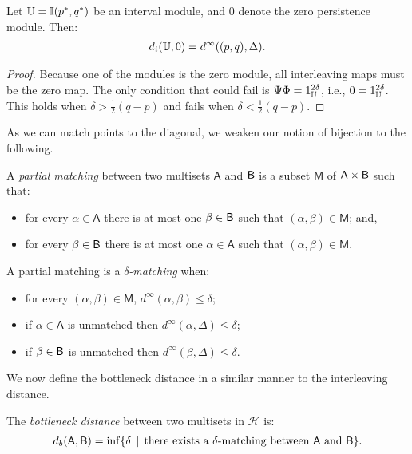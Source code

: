 \begin{proposition}
Let $\mathbb{U} = \mathbb{I}(p^*, q^*)$ be an interval module, and $0$ denote the zero persistence module. Then:
\begin{align*}
d_i(\mathbb{U}, 0) = d^\infty((p, q), \Delta).
\end{align*}
\end{proposition}
\begin{proof}
Because one of the modules is the zero module, all interleaving maps must be the zero map. The only condition that could fail is $\Psi \Phi = 1_{\mathbb{U}}^{2\delta}$, i.e., $0 = 1_{\mathbb{U}}^{2\delta}$. This holds when $\delta > \tfrac{1}{2}(q-p)$ and fails when $\delta < \tfrac{1}{2}(q-p)$.
\end{proof}

As we can match points to the diagonal, we weaken our notion of bijection to the following.

\begin{definition}
A \emph{partial matching} between two multisets $\mathsf{A}$ and $\mathsf{B}$ is a subset $\mathsf{M}$ of $\mathsf{A} \times \mathsf{B}$ such that:
\begin{itemize}
\item for every $\alpha \in \mathsf{A}$ there is at most one $\beta \in \mathsf{B}$ such that $(\alpha, \beta) \in \mathsf{M}$; and,
\item for every $\beta \in \mathsf{B}$ there is at most one $\alpha \in \mathsf{A}$ such that $(\alpha, \beta) \in \mathsf{M}$.
\end{itemize}
\end{definition}

\begin{definition}
A partial matching is a \emph{$\delta$-matching} when:
\begin{itemize}
\item for every $(\alpha, \beta) \in \mathsf{M}$, $d^\infty(\alpha, \beta) \leq \delta$;
\item if $\alpha \in \mathsf{A}$ is unmatched then $d^\infty(\alpha, \Delta) \leq \delta$;
\item if $\beta \in \mathsf{B}$ is unmatched then $d^\infty(\beta, \Delta) \leq \delta$.
\end{itemize}
\end{definition}

We now define the bottleneck distance in a similar manner to the interleaving distance.

\begin{definition}
The \emph{bottleneck distance} between two multisets in $\mathcal{H}$ is:
\begin{align*}
d_b(\mathsf{A}, \mathsf{B}) = \inf \{ \delta \, \mid \, \text{there exists a $\delta$-matching between $\mathsf{A}$ and $\mathsf{B}$}\}.
\end{align*}
\end{definition}

